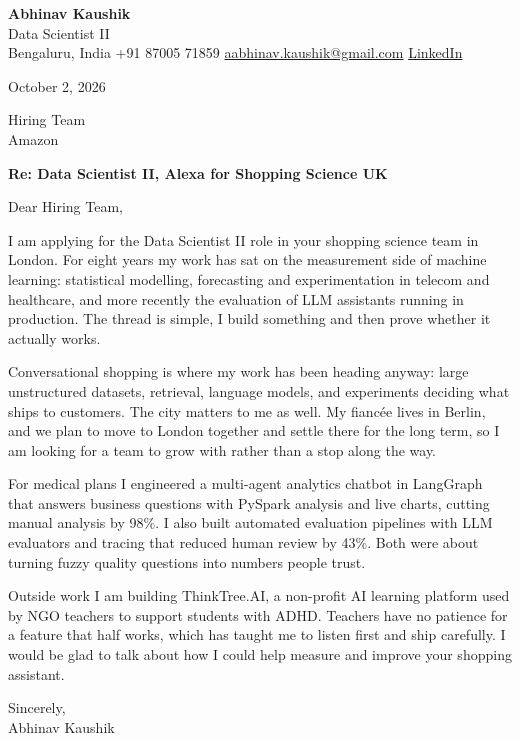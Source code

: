 \documentclass[11pt,a4paper]{article}
\begin{document}
{\Large\bfseries Abhinav Kaushik}\\
Data Scientist II\\
Bengaluru, India \textbar{} +91 87005 71859 \textbar{} \href{mailto:aabhinav.kaushik@gmail.com}{aabhinav.kaushik@gmail.com} \textbar{} \href{https://www.linkedin.com/in/abhinav-kaushik10/}{LinkedIn}  

October 2, 2026

Hiring Team\\
Amazon

\textbf{Re: Data Scientist II, Alexa for Shopping Science UK}

Dear Hiring Team,

I am applying for the Data Scientist II role in your shopping science team in London. For eight years my work has sat on the measurement side of machine learning: statistical modelling, forecasting and experimentation in telecom and healthcare, and more recently the evaluation of LLM assistants running in production. The thread is simple, I build something and then prove whether it actually works.

Conversational shopping is where my work has been heading anyway: large unstructured datasets, retrieval, language models, and experiments deciding what ships to customers. The city matters to me as well. My fiancée lives in Berlin, and we plan to move to London together and settle there for the long term, so I am looking for a team to grow with rather than a stop along the way.

For medical plans I engineered a multi-agent analytics chatbot in LangGraph that answers business questions with PySpark analysis and live charts, cutting manual analysis by 98\%. I also built automated evaluation pipelines with LLM evaluators and tracing that reduced human review by 43\%. Both were about turning fuzzy quality questions into numbers people trust.

Outside work I am building ThinkTree.AI, a non-profit AI learning platform used by NGO teachers to support students with ADHD. Teachers have no patience for a feature that half works, which has taught me to listen first and ship carefully. I would be glad to talk about how I could help measure and improve your shopping assistant.

Sincerely,\\[4pt]
Abhinav Kaushik
\end{document}
